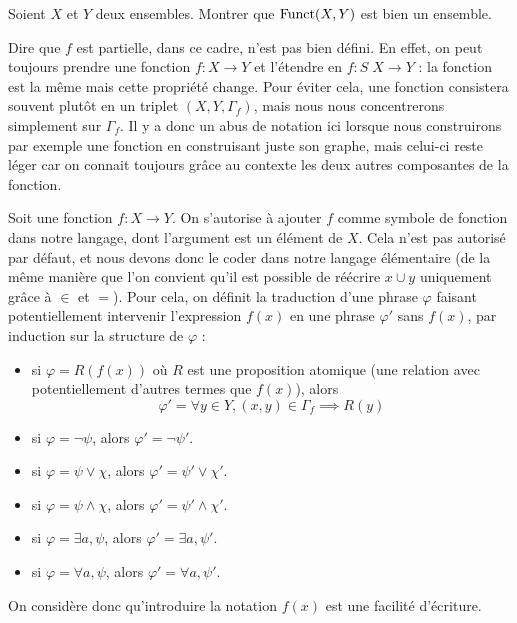 \begin{exercise}
  Soient $X$ et $Y$ deux ensembles. Montrer que $\operatorname{Funct}(X,Y)$ est bien un
  ensemble.
\end{exercise}

\begin{remark}
  Dire que $f$ est partielle, dans ce cadre, n'est pas bien défini. En effet, on
  peut toujours prendre une fonction $f : X \to Y$ et l'étendre en
  $f : S\;X \to Y$ : la fonction est la même mais cette propriété change. Pour
  éviter cela, une fonction consistera souvent plutôt en un triplet
  $(X,Y,\Gamma_f)$, mais nous nous concentrerons simplement sur $\Gamma_f$. Il y
  a donc un abus de notation ici lorsque nous construirons par exemple une
  fonction en construisant juste son graphe, mais celui-ci reste léger car on
  connait toujours grâce au contexte les deux autres composantes de la fonction.
\end{remark}

\begin{notation}
  Soit une fonction $f : X \to Y$. On s'autorise à ajouter $f$ comme symbole de
  fonction dans notre langage, dont l'argument est un élément de $X$. Cela n'est
  pas autorisé par défaut, et nous devons donc le coder dans notre langage
  élémentaire (de la même manière que l'on convient qu'il est possible de
  réécrire $x\cup y$ uniquement grâce à $\in$ et $=$). Pour cela, on définit la
  traduction d'une phrase $\varphi$ faisant potentiellement intervenir
  l'expression $f(x)$ en une phrase $\varphi'$ sans $f(x)$, par induction sur
  la structure de $\varphi$ :
  \begin{itemize}
  \item si $\varphi = R(f(x))$ où $R$ est une proposition atomique (une relation
    avec potentiellement d'autres termes que $f(x)$), alors
    \[\varphi' = \forall y\in Y, (x,y)\in \Gamma_f \implies R(y)\]
  \item si $\varphi = \lnot \psi$, alors $\varphi' = \lnot \psi'$.
  \item si $\varphi = \psi \lor \chi$, alors $\varphi' = \psi'\lor \chi'$.
  \item si $\varphi = \psi \land \chi$, alors $\varphi' = \psi'\land \chi'$.
  \item si $\varphi = \exists a, \psi$, alors $\varphi' = \exists a, \psi'$.
  \item si $\varphi = \forall a, \psi$, alors $\varphi' = \forall a, \psi'$.
  \end{itemize}

  On considère donc qu'introduire la notation $f(x)$ est une facilité
  d'écriture.
\end{notation}

